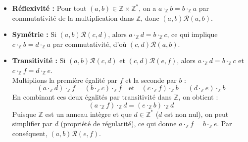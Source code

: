 \documentclass{article}
\begin{document}
\begin{itemize}
    \item \textbf{Réflexivité :} Pour tout $(a, b) \in \mathbb{Z} \times \mathbb{Z}^*$, on a $a \cdot_{\mathbb{Z}} b = b \cdot_{\mathbb{Z}} a$ par commutativité de la multiplication dans $\mathbb{Z}$, donc $(a, b) \mathcal{R} (a, b)$.
    \item \textbf{Symétrie :} Si $(a, b) \mathcal{R} (c, d)$, alors $a \cdot_{\mathbb{Z}} d = b \cdot_{\mathbb{Z}} c$, ce qui implique $c \cdot_{\mathbb{Z}} b = d \cdot_{\mathbb{Z}} a$ par commutativité, d'où $(c, d) \mathcal{R} (a, b)$.
    \item \textbf{Transitivité :} Si $(a, b) \mathcal{R} (c, d)$ et $(c, d) \mathcal{R} (e, f)$, alors $a \cdot_{\mathbb{Z}} d = b \cdot_{\mathbb{Z}} c$ et $c \cdot_{\mathbb{Z}} f = d \cdot_{\mathbb{Z}} e$.\\
    Multiplions la première égalité par $f$ et la seconde par $b$ :
    $$ (a \cdot_{\mathbb{Z}} d) \cdot_{\mathbb{Z}} f = (b \cdot_{\mathbb{Z}} c) \cdot_{\mathbb{Z}} f \quad \text{et} \quad (c \cdot_{\mathbb{Z}} f) \cdot_{\mathbb{Z}} b = (d \cdot_{\mathbb{Z}} e) \cdot_{\mathbb{Z}} b $$
    En combinant ces deux égalités par transitivité dans $\mathbb{Z}$, on obtient :
    $$ (a \cdot_{\mathbb{Z}} f) \cdot_{\mathbb{Z}} d = (e \cdot_{\mathbb{Z}} b) \cdot_{\mathbb{Z}} d $$
    Puisque $\mathbb{Z}$ est un anneau intègre et que $d \in \mathbb{Z}^*$ ($d$ est non nul), on peut simplifier par $d$ (propriété de régularité), ce qui donne $a \cdot_{\mathbb{Z}} f = b \cdot_{\mathbb{Z}} e$. Par conséquent, $(a, b) \mathcal{R} (e, f)$.
\end{itemize}



\end{document}
